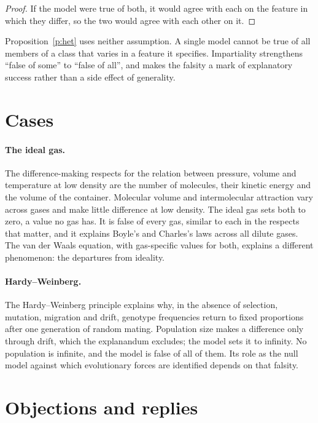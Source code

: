 \documentclass{situationist-preprint}
\begin{document}
\begin{proof}
If the model were true of both, it would agree with each on the feature in which they differ, so the two would agree with each other on it.
\end{proof}

Proposition~\ref{p:het} uses neither assumption. A single model cannot be true of all members of a class that varies in a feature it specifies. Impartiality strengthens \enquote{false of some} to \enquote{false of all}, and makes the falsity a mark of explanatory success rather than a side effect of generality.

\section{Cases}

\paragraph{The ideal gas.} The difference-making respects for the relation between pressure, volume and temperature at low density are the number of molecules, their kinetic energy and the volume of the container. Molecular volume and intermolecular attraction vary across gases and make little difference at low density. The ideal gas sets both to zero, a value no gas has. It is false of every gas, similar to each in the respects that matter, and it explains Boyle's and Charles's laws across all dilute gases. The van der Waals equation, with gas-specific values for both, explains a different phenomenon: the departures from ideality.

\paragraph{Hardy--Weinberg.} The Hardy--Weinberg principle explains why, in the absence of selection, mutation, migration and drift, genotype frequencies return to fixed proportions after one generation of random mating. Population size makes a difference only through drift, which the explanandum excludes; the model sets it to infinity. No population is infinite, and the model is false of all of them. Its role as the null model against which evolutionary forces are identified depends on that falsity.

\section{Objections and replies}
\end{document}
